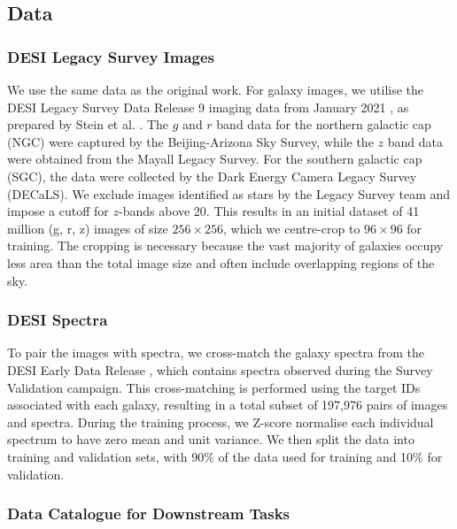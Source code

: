 \documentclass[draft, a4paper,12pt]{article}
\begin{document}
\subsection{Data}
\label{sec:data}
\subsubsection{DESI Legacy Survey Images}
We use the same data as the original work. For galaxy images, we utilise the DESI Legacy Survey Data Release 9 imaging data from January 2021 \cite{DESI}, as prepared by Stein et al. \cite{stein}. The $g$ and $r$ band data for the northern galactic cap (NGC) were captured by the Beijing-Arizona Sky Survey, while the $z$ band data were obtained from the Mayall Legacy Survey. For the southern galactic cap (SGC), the data were collected by the Dark Energy Camera Legacy Survey (DECaLS). We exclude images identified as stars by the Legacy Survey team and impose a cutoff for $z$-bands above 20. This results in an initial dataset of 41 million (g, r, z) images of size $256 \times 256$, which we centre-crop to $96 \times 96$ for training. The cropping is necessary because the vast majority of galaxies occupy less area than the total image size and often include overlapping regions of the sky.


\subsubsection{DESI Spectra}
To pair the images with spectra, we cross-match the galaxy spectra from the DESI Early Data Release \cite{DESI2023}, which contains spectra observed during the Survey Validation campaign. This cross-matching is performed using the target IDs associated with each galaxy, resulting in a total subset of 197,976 pairs of images and spectra. During the training process, we Z-score normalise each individual spectrum to have zero mean and unit variance. We then split the data into training and validation sets, with 90\% of the data used for training and 10\% for validation.


\subsubsection{Data Catalogue for Downstream Tasks}
\end{document}
